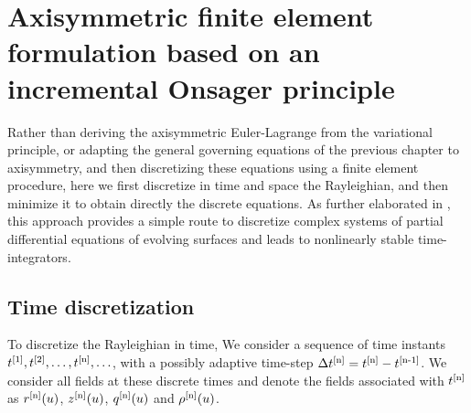 \section{Axisymmetric finite element formulation based on an incremental Onsager principle} \label{2_3_2}

Rather than deriving the axisymmetric Euler-Lagrange from the variational principle, or adapting the general governing equations of the previous chapter to axisymmetry, and then discretizing these equations using a finite element procedure, here we first discretize in time and space the Rayleighian, and then minimize it to obtain directly the discrete equations. As further elaborated in \cite{torres2019}, this approach provides a simple route to discretize complex systems of partial differential equations of evolving surfaces and leads to nonlinearly stable time-integrators.

\subsection{Time discretization}

To discretize the Rayleighian in time, We consider a sequence of time instants $t^{[1]},t^{[2]}, \ldots , t^{[\textup{n}]}, \ldots$, with a possibly adaptive time-step $\Delta t^{[\textup{n}]} = t^{[\textup{n}]}- t^{[\textup{n-1}]}$. We consider all fields at these discrete times and denote the fields associated with $t^{[\textup{n}]}$  as $r^{[\textup{n}]}(u)$, $z^{[\textup{n}]}(u)$, $q^{[\textup{n}]}(u)$ and $\rho^{[\textup{n}]}(u)$.

